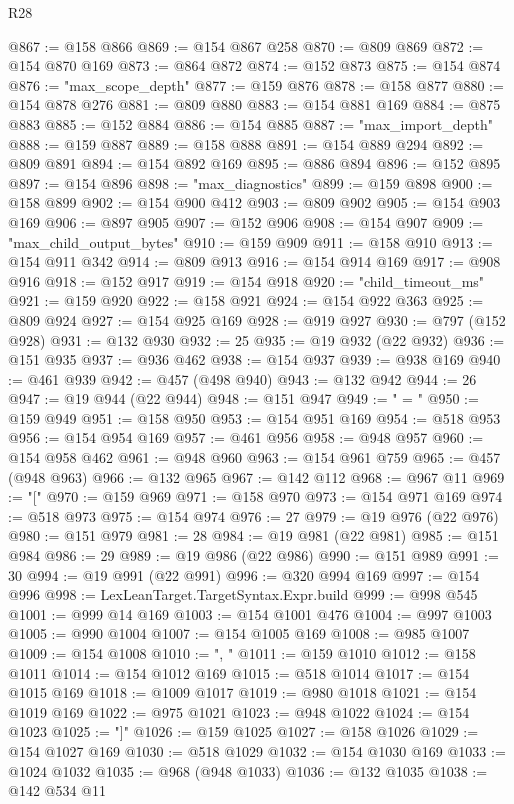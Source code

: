 \begin{lexlean}{R28}
\begin{coremodule}
@867 := @158 @866
@869 := @154 @867 @258
@870 := @809 @869
@872 := @154 @870 @169
@873 := @864 @872
@874 := @152 @873
@875 := @154 @874
@876 := "max_scope_depth"
@877 := @159 @876
@878 := @158 @877
@880 := @154 @878 @276
@881 := @809 @880
@883 := @154 @881 @169
@884 := @875 @883
@885 := @152 @884
@886 := @154 @885
@887 := "max_import_depth"
@888 := @159 @887
@889 := @158 @888
@891 := @154 @889 @294
@892 := @809 @891
@894 := @154 @892 @169
@895 := @886 @894
@896 := @152 @895
@897 := @154 @896
@898 := "max_diagnostics"
@899 := @159 @898
@900 := @158 @899
@902 := @154 @900 @412
@903 := @809 @902
@905 := @154 @903 @169
@906 := @897 @905
@907 := @152 @906
@908 := @154 @907
@909 := "max_child_output_bytes"
@910 := @159 @909
@911 := @158 @910
@913 := @154 @911 @342
@914 := @809 @913
@916 := @154 @914 @169
@917 := @908 @916
@918 := @152 @917
@919 := @154 @918
@920 := "child_timeout_ms"
@921 := @159 @920
@922 := @158 @921
@924 := @154 @922 @363
@925 := @809 @924
@927 := @154 @925 @169
@928 := @919 @927
@930 := @797 (@152 @928)
@931 := @132 @930
@932 := 25
@935 := @19 @932 (@22 @932)
@936 := @151 @935
@937 := @936 @462
@938 := @154 @937
@939 := @938 @169
@940 := @461 @939
@942 := @457 (@498 @940)
@943 := @132 @942
@944 := 26
@947 := @19 @944 (@22 @944)
@948 := @151 @947
@949 := " = "
@950 := @159 @949
@951 := @158 @950
@953 := @154 @951 @169
@954 := @518 @953
@956 := @154 @954 @169
@957 := @461 @956
@958 := @948 @957
@960 := @154 @958 @462
@961 := @948 @960
@963 := @154 @961 @759
@965 := @457 (@948 @963)
@966 := @132 @965
@967 := @142 @112
@968 := @967 @11
@969 := "["
@970 := @159 @969
@971 := @158 @970
@973 := @154 @971 @169
@974 := @518 @973
@975 := @154 @974
@976 := 27
@979 := @19 @976 (@22 @976)
@980 := @151 @979
@981 := 28
@984 := @19 @981 (@22 @981)
@985 := @151 @984
@986 := 29
@989 := @19 @986 (@22 @986)
@990 := @151 @989
@991 := 30
@994 := @19 @991 (@22 @991)
@996 := @320 @994 @169
@997 := @154 @996
@998 := LexLeanTarget.TargetSyntax.Expr.build
@999 := @998 @545
@1001 := @999 @14 @169
@1003 := @154 @1001 @476
@1004 := @997 @1003
@1005 := @990 @1004
@1007 := @154 @1005 @169
@1008 := @985 @1007
@1009 := @154 @1008
@1010 := ", "
@1011 := @159 @1010
@1012 := @158 @1011
@1014 := @154 @1012 @169
@1015 := @518 @1014
@1017 := @154 @1015 @169
@1018 := @1009 @1017
@1019 := @980 @1018
@1021 := @154 @1019 @169
@1022 := @975 @1021
@1023 := @948 @1022
@1024 := @154 @1023
@1025 := "]"
@1026 := @159 @1025
@1027 := @158 @1026
@1029 := @154 @1027 @169
@1030 := @518 @1029
@1032 := @154 @1030 @169
@1033 := @1024 @1032
@1035 := @968 (@948 @1033)
@1036 := @132 @1035
@1038 := @142 @534 @11

\end{coremodule}
\end{lexlean}
